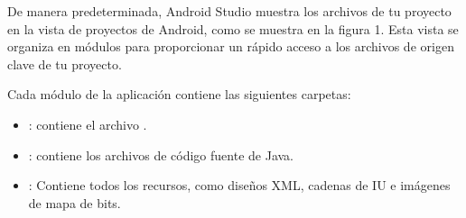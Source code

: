 De manera predeterminada, Android Studio muestra los archivos de tu proyecto en la vista de proyectos de Android, como se muestra en la figura 1. Esta vista se organiza en módulos para proporcionar un rápido acceso a los archivos de origen clave de tu proyecto.

Cada módulo de la aplicación contiene las siguientes carpetas:
\begin{itemize}
\item {} 
: contiene el archivo .

\item {} 
: contiene los archivos de código fuente de Java.

\item {} 
: Contiene todos los recursos, como diseños XML, cadenas de IU e imágenes de mapa de bits.

\end{itemize}

%
%
%
%
%
%
%

